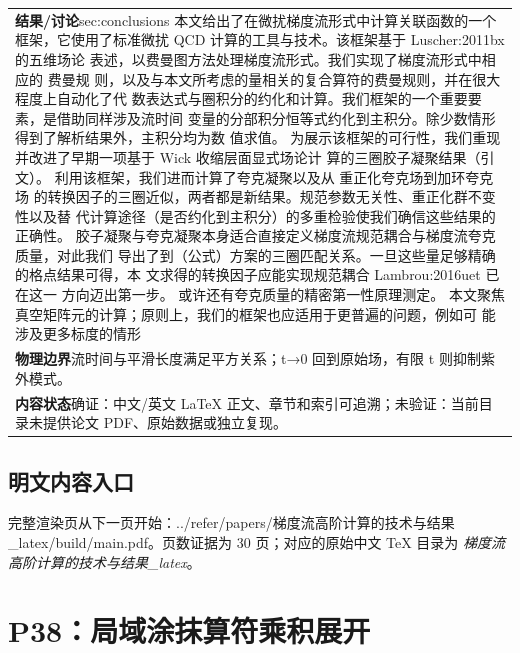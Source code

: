 \documentclass[UTF8,11pt,oneside]{ctexbook}
\begin{document}
\begin{table}[htbp]
\begin{tabular}{@{}p{}@{}}
    \textbf{结果/讨论}\quad sec:conclusions 本文给出了在微扰梯度流形式中计算关联函数的一个框架，它使用了标准微扰 QCD 计算的工具与技术。该框架基于 Luscher:2011bx 的五维场论 表述，以费曼图方法处理梯度流形式。我们实现了梯度流形式中相应的 费曼规 则，以及与本文所考虑的量相关的复合算符的费曼规则，并在很大程度上自动化了代 数表达式与圈积分的约化和计算。我们框架的一个重要要素，是借助同样涉及流时间 变量的分部积分恒等式约化到主积分。除少数情形得到了解析结果外，主积分均为数 值求值。 为展示该框架的可行性，我们重现并改进了早期一项基于 Wick 收缩层面显式场论计 算的三圈胶子凝聚结果（引文）。 利用该框架，我们进而计算了夸克凝聚以及从 重正化夸克场到加环夸克场 的转换因子的三圈近似，两者都是新结果。规范参数无关性、重正化群不变性以及替 代计算途径（是否约化到主积分）的多重检验使我们确信这些结果的正确性。 胶子凝聚与夸克凝聚本身适合直接定义梯度流规范耦合与梯度流夸克质量，对此我们 导出了到（公式）方案的三圈匹配关系。一旦这些量足够精确的格点结果可得，本 文求得的转换因子应能实现规范耦合 Lambrou:2016uet 已在这一 方向迈出第一步。 或许还有夸克质量的精密第一性原理测定。 本文聚焦真空矩阵元的计算；原则上，我们的框架也应适用于更普遍的问题，例如可 能涉及更多标度的情形 \\
    \textbf{物理边界}\quad 流时间与平滑长度满足平方关系；t→0 回到原始场，有限 t 则抑制紫外模式。 \\
    \textbf{内容状态}\quad 确证：中文/英文 LaTeX 正文、章节和索引可追溯；未验证：当前目录未提供论文 PDF、原始数据或独立复现。 \\
    \bottomrule
  \end{tabular}
\end{table}
\section*{明文内容入口}
\noindent 完整渲染页从下一页开始：../\allowbreak{}refer/\allowbreak{}papers/\allowbreak{}梯度流高阶计算的技术与结果\_\allowbreak{}latex/\allowbreak{}build/\allowbreak{}main.pdf。页数证据为 30 页；对应的原始中文 TeX 目录为 \emph{梯度流高阶计算的技术与结果\_latex}。
\clearpage

\clearpage

\chapter{P38：局域涂抹算符乘积展开}
\end{document}

